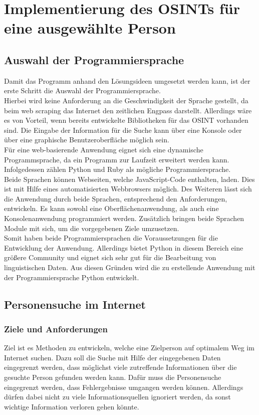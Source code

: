 
\chapter{Implementierung des OSINTs für eine ausgewählte Person}  %
\label{cha:Informationsbeschaffung einer ausgewählten Person} %
\section{Auswahl der Programmiersprache}
Damit das Programm anhand den Lösungsideen umgesetzt werden kann, ist der erste Schritt die Auswahl der Programmiersprache.\\
Hierbei wird keine Anforderung an die Geschwindigkeit der Sprache gestellt, da beim web scraping das Internet den zeitlichen Engpass darstellt. Allerdings wäre es von Vorteil, wenn bereits entwickelte Bibliotheken für das OSINT vorhanden sind. Die Eingabe der Information für die Suche kann über eine Konsole oder über eine graphische Benutzeroberfläche möglich sein.\\
Für eine web-basierende Anwendung eignet sich eine dynamische Programmsprache, da ein Programm zur Laufzeit erweitert werden kann. Infolgedessen zählen Python und Ruby als mögliche Programmiersprache.\\
Beide Sprachen können Webseiten, welche JavaScript-Code enthalten, laden. Dies ist mit Hilfe eines automatisierten Webbrowsers möglich. Des Weiteren lässt sich die Anwendung durch beide Sprachen, entsprechend den Anforderungen, entwickeln. Es kann sowohl eine Oberflächenanwendung, als auch eine Konsolenanwendung programmiert werden. Zusätzlich bringen beide Sprachen Module mit sich, um die vorgegebenen Ziele umzusetzen.\\ Somit haben beide Programmiersprachen die Voraussetzungen für die Entwicklung der Anwendung. Allerdings bietet Python in diesem Bereich eine größere Community und eignet sich sehr gut für die Bearbeitung von linguistischen Daten. \cite{bird2009natural} Aus diesen Gründen wird die zu erstellende Anwendung mit der Programmiersprache Python entwickelt.

\section{Personensuche im Internet}
	\subsection{Ziele und Anforderungen}
	Ziel ist es Methoden zu entwickeln, welche eine Zielperson auf optimalem Weg im Internet suchen. Dazu soll die Suche mit Hilfe der eingegebenen Daten eingegrenzt werden, dass möglichst viele zutreffende Informationen über die gesuchte Person gefunden werden kann. Dafür muss die Personensuche eingegrenzt werden, dass Fehlergebnisse umgangen werden können. Allerdings dürfen dabei nicht zu viele Informationsquellen ignoriert werden, da sonst wichtige Information verloren gehen könnte.
	
